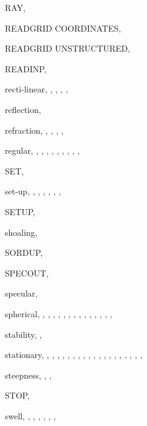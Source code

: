 \documentclass[12pt]{book}
\begin{document}
\begin{theindex}
  \indexspace

  \item RAY, 
  \item READGRID COORDINATES, 
  \item READGRID UNSTRUCTURED, 
  \item READINP, 
  \item recti-linear, , , ,
		, 
  \item reflection, 
  \item refraction, , , ,
		, 
  \item regular, , , ,
		, , ,
		, , ,

  \indexspace

  \item SET, 
  \item set-up, , , ,
		, , ,
  \item SETUP, 
  \item shoaling, 
  \item SORDUP, 
  \item SPECOUT, 
  \item specular, 
  \item spherical, , , ,
		, , ,
		, , ,
		, , ,
		, , 
  \item stability, , 
  \item stationary, , , ,
		, , ,
		, ,
		, , ,
		, , ,
		, , ,
		, , 
  \item steepness, , , 
  \item STOP, 
  \item swell, , , ,
		, , ,


\end{theindex}
\end{document}
